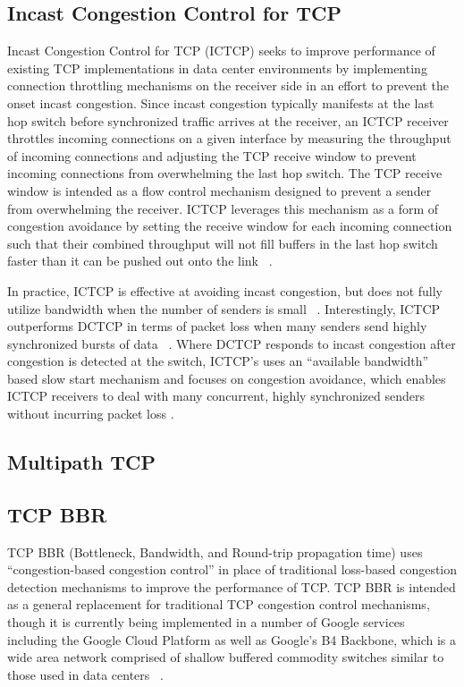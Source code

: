 \subsection{Incast Congestion Control for TCP}

Incast Congestion Control for TCP (ICTCP) seeks to improve performance of existing TCP implementations in data center environments by implementing connection throttling mechanisms on the receiver side in an effort to prevent the onset incast congestion. Since incast congestion typically manifests at the last hop switch before synchronized traffic arrives at the receiver, an ICTCP receiver throttles incoming connections on a given interface by measuring the throughput of incoming connections and adjusting the TCP receive window to prevent incoming connections from overwhelming the last hop switch. The TCP receive window is intended as a flow control mechanism designed to prevent a sender from overwhelming the receiver. ICTCP leverages this mechanism as a form of congestion avoidance by setting the receive window for each incoming connection such that their combined throughput will not fill buffers in the last hop switch faster than it can be pushed out onto the link ~\cite{wu_ictcp:_2013}. 

In practice, ICTCP is effective at avoiding incast congestion, but does not fully utilize bandwidth when the number of senders is small ~\cite{wu_ictcp:_2013}. Interestingly, ICTCP outperforms DCTCP in terms of packet loss when many senders send highly synchronized bursts of data ~\cite{wu_ictcp:_2013, alizadeh_data_2010}. Where DCTCP responds to incast congestion after congestion is detected at the switch, ICTCP's uses an ``available bandwidth'' based slow start mechanism and focuses on congestion avoidance, which enables ICTCP receivers to deal with many concurrent, highly synchronized senders without incurring packet loss \cite{alizadeh_data_2010, wu_ictcp:_2013}.

\subsection{Multipath TCP}

\subsection{TCP BBR}

TCP BBR (Bottleneck, Bandwidth, and Round-trip propagation time) uses ``congestion-based congestion control'' in place of traditional loss-based congestion detection mechanisms to improve the performance of TCP. TCP BBR is intended as a general replacement for traditional TCP congestion control mechanisms, though it is currently being implemented in a number of Google services including the Google Cloud Platform as well as Google's B4 Backbone, which is a wide area network comprised of shallow buffered commodity switches similar to those used in data centers ~\cite{cardwell_bbr:_2016, cardwell_tcp_2017}. 

